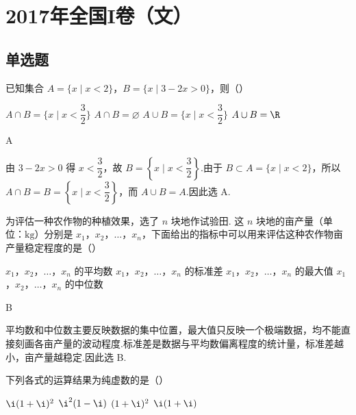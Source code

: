 \chapter{2017年全国I卷（文）}

\section{单选题}

\begin{problem}
已知集合 \(A=\{x\mid x<2\}\)，\(B=\{x\mid 3-2x>0\}\)，则（\quad）

\choices
    {\(A\cap B=\{x\mid x<\dfrac{3}{2}\}\)}
    {\(A\cap B=\varnothing\)}
    {\(A\cup B=\{x\mid x<\dfrac{3}{2}\}\)}
    {\(A\cup B=\R\)}
\end{problem}

\begin{answer}
A
\end{answer}

\begin{solution}
由 \(3-2x>0\) 得 \(x<\dfrac{3}{2}\)，故 \(B=\left\{x\mid x<\dfrac{3}{2}\right\}\).由于 \(B\subset A=\{x\mid x<2\}\)，所以 \(A\cap B=B=\left\{x\mid x<\dfrac{3}{2}\right\}\)，而 \(A\cup B=A\).因此选 A.
\end{solution}

\begin{problem}
为评估一种农作物的种植效果，选了 \(n\) 块地作试验田. 这 \(n\) 块地的亩产量（单位：\(\mathrm{kg}\)）分别是 \(x_1\)，\(x_2\)，\(\dots\)，\(x_n\)，下面给出的指标中可以用来评估这种农作物亩产量稳定程度的是（\quad）

\choices
    {\(x_1\)，\(x_2\)，\(\dots\)，\(x_n\) 的平均数}
    {\(x_1\)，\(x_2\)，\(\dots\)，\(x_n\) 的标准差}
    {\(x_1\)，\(x_2\)，\(\dots\)，\(x_n\) 的最大值}
    {\(x_1\)，\(x_2\)，\(\dots\)，\(x_n\) 的中位数}
\end{problem}

\begin{answer}
B
\end{answer}

\begin{solution}
平均数和中位数主要反映数据的集中位置，最大值只反映一个极端数据，均不能直接刻画各亩产量的波动程度.标准差是数据与平均数偏离程度的统计量，标准差越小，亩产量越稳定.因此选 B.
\end{solution}

\begin{problem}
下列各式的运算结果为纯虚数的是（\quad）

\choices
    {\(\i(1+\i)^2\)}
    {\(\i^2(1-\i)\)}
    {\((1+\i)^2\)}
    {\(\i(1+\i)\)}
\end{problem}

